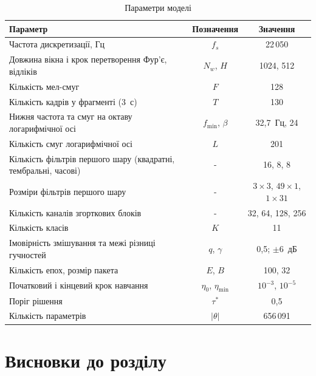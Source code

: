 \begin{table}[H]
\centering
\caption{Параметри моделі}
\label{tab:mm_params}
\small
\begin{tabular}{|p{8.6cm}|c|c|}
\hline
Параметр & Позначення & Значення \\
\hline
Частота дискретизації, Гц & $f_s$ & 22\,050 \\
Довжина вікна і крок перетворення Фур'є, відліків & $N_w$, $H$ & 1024, 512 \\
Кількість мел-смуг & $F$ & 128 \\
Кількість кадрів у фрагменті (3~с) & $T$ & 130 \\
Нижня частота та смуг на октаву логарифмічної осі & $f_{\min}$, $\beta$ & 32,7~Гц, 24 \\
Кількість смуг логарифмічної осі & $L$ & 201 \\
Кількість фільтрів першого шару (квадратні, тембральні, часові) & - & 16, 8, 8 \\
Розміри фільтрів першого шару & - & $3 \times 3$, $49 \times 1$, $1 \times 31$ \\
Кількість каналів згорткових блоків & - & 32, 64, 128, 256 \\
Кількість класів & $K$ & 11 \\
Імовірність змішування та межі різниці гучностей & $q$, $\gamma$ & 0,5;\; $\pm 6$~дБ \\
Кількість епох, розмір пакета & $E$, $B$ & 100, 32 \\
Початковий і кінцевий крок навчання & $\eta_0$, $\eta_{\min}$ & $10^{-3}$, $10^{-5}$ \\
Поріг рішення & $\tau^{*}$ & 0,5 \\
Кількість параметрів & $|\theta|$ & 656\,091 \\
\hline
\end{tabular}
\end{table}

\section{Висновки до розділу}
\label{sec:ch2_conclusions}

